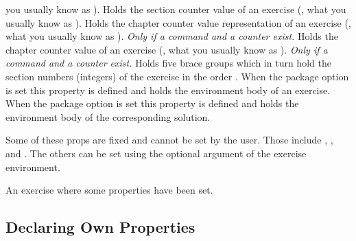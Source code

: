 \documentclass{xsim-manual}
\begin{document}
\begin{properties}
    you usually know as ).
    Holds the section counter value of an exercise (\ie, what you usually know
    as ).
    Holds the chapter counter value representation of an exercise (\ie, what
    you usually know as ).  \emph{Only if a command
       \emph{and} a counter  exist.}
    Holds the chapter counter value of an exercise (\ie, what you usually know
    as ).  \emph{Only if a command 
      \emph{and} a counter  exist.}
    Holds five brace groups which in turn hold the section numbers (integers)
    of the exercise in the order
    .
    When the package option  is set this
    property is defined and holds the environment body of an exercise.
    When the package option  is set this
    property is defined and holds the environment body of the corresponding
    solution.
\end{properties}

Some of these \acsp*{prop} are fixed and cannot be set by the user.  Those
include , , and .  The
others can be set using the optional argument of the exercise environment.

\begin{example}
  \begin{exercise}[subtitle={This is a subtitle},points=4,bonus-points=1]
    An exercise where some properties have been set.
  \end{exercise}
\end{example}

\subsection{Declaring Own Properties}
\end{document}
